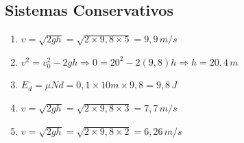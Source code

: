 \documentclass[a4paper,12pt]{article}
\newcommand{\printingbibliography}{%

    \pagestyle{myheadings}
    \markright{}
    \sloppy
    \printbibliography[heading=bibintoc, %
                   title=Refer\^encias %
                  ]
    \fussy%
}
\begin{document}
\subsection{Sistemas Conservativos}
\begin{enumerate}
\item $v = \sqrt{2gh} = \sqrt{2\times9{,}8\times5} = 9{,}9\,m/s$
\item $v^2 = v_0^2 - 2gh \Rightarrow 0 = 20^2 - 2(9{,}8)h \Rightarrow h = 20{,}4\,m$
\item $E_d = \mu N d = 0{,}1\times10m\times9{,}8=9{,}8\,J$
\item $v = \sqrt{2gh} = \sqrt{2\times9{,}8\times3} = 7{,}7\,m/s$
\item $v = \sqrt{2gh} = \sqrt{2\times9{,}8\times2} = 6{,}26\,m/s$
\end{enumerate}

\printingbibliography
\end{document}
